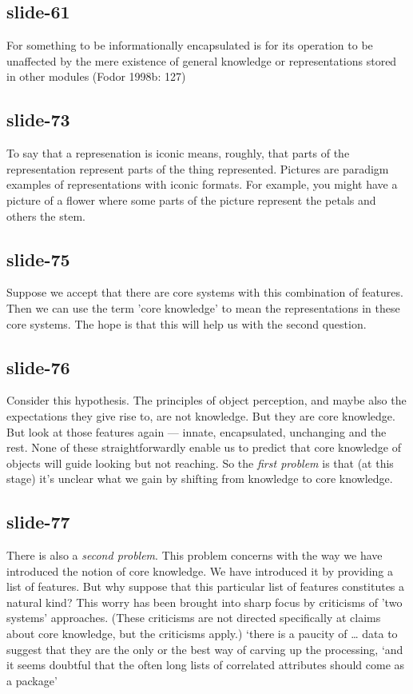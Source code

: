 \documentclass[12pt,\papersize]{extarticle}
\begin{document}
 
\subsection{slide-61}
For something to be informationally encapsulated is for its operation to be unaffected by the mere existence of general knowledge or representations stored in other modules (Fodor 1998b: 127)
 
 
\subsection{slide-73}
To say that a represenation is iconic means, roughly, that parts of the representation represent parts of the thing represented.
Pictures are paradigm examples of representations with iconic formats.
For example, you might have a picture of a flower where some parts of the picture represent the petals and others the stem.
 
 
\subsection{slide-75}
Suppose we accept that there are core systems with this combination of features.
Then we can use the term 'core knowledge' to mean the representations in these core systems.
The hope is that this will help us with the second question.
 
 
\subsection{slide-76}
Consider this hypothesis.
The principles of object perception, and maybe also the expectations they give rise to, are not knowledge.
But they are core knowledge.
But look at those features again --- innate, encapsulated, unchanging and the rest.
None of these straightforwardly enable us to predict that core knowledge of objects will guide looking but not reaching.
So the \emph{first problem} is that (at this stage) it's unclear what we gain by shifting from knowledge to core knowledge.
 
 
\subsection{slide-77}
There is also a \emph{second problem}.
This problem concerns with the way we have introduced the notion of core knowledge.
We have introduced it by providing a list of features.
But why suppose that this particular list of features constitutes a natural kind?
This worry has been brought into sharp focus by criticisms of 'two systems' approaches.
(These criticisms are not directed specifically at claims about core knowledge, but the criticisms apply.)
‘there is a paucity of … data to suggest that they are the only or the best way of carving up the processing,
‘and it seems doubtful that the often long lists of correlated attributes should come as a package’
\citep[p.\ 759]{adolphs_conceptual_2010}
 
\end{document}
